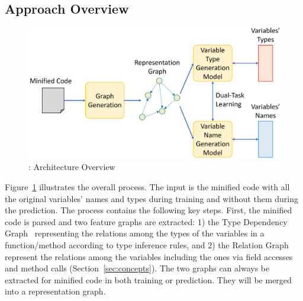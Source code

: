 \subsection{Approach Overview}


\begin{figure}[t]
	\begin{center}
	  \includegraphics[width=0.95\columnwidth]{figures/overview.png}
          \vspace{-10pt}
		\caption{{\tool}: Architecture Overview}
		\label{overview}
	\end{center}
\end{figure}



Figure~\ref{overview} illustrates the overall process. The input is
the minified code with all the original variables' names and types
during training and without them during the prediction.
%
The process contains the following key steps. First, the minified code
is parsed and two feature graphs are extracted: 1) the Type Dependency
Graph~\cite{type-graph-icse22} representing the relations among the
types of the variables in a function/method according to type
inference rules, and 2) the Relation Graph~\cite{icse19} represent the
relations among the variables including the ones via field accesses
and method calls (Section~\ref{sec:concepts}). The two graphs can
always be extracted for minified code in both training or
prediction. They will be merged into a representation graph.

